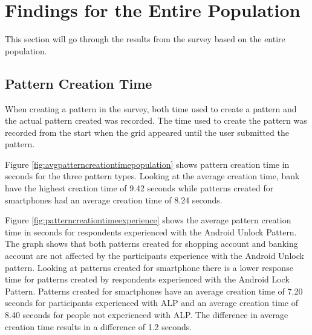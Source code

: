 \section{Findings for the Entire Population}
  
  This section will go through the results from the survey based on the entire population. 

  


	\subsection{Pattern Creation Time}
    When creating a pattern in the survey, both time used to create a pattern and the actual pattern created was recorded. The time used to create the pattern was recorded from the start when the grid appeared until the user submitted the pattern.

    Figure \ref{fig:avgpatterncreationtimepopulation} shows pattern creation time in seconds for the three pattern types. Looking at the average creation time, bank have the highest creation time of 9.42 seconds while patterns created for smartphones had an average creation time of 8.24 seconds. 

    Figure \ref{fig:patterncreationtimeexperience} shows the average pattern creation time in seconds for respondents experienced with the Android Unlock Pattern. The graph shows that both patterns created for shopping account and banking account are not affected by the participants experience with the Android Unlock pattern. Looking at patterns created for smartphone there is a lower response time for patterns created by respondents experienced with the Android Lock Pattern. Patterns created for smartphones have an average creation time of 7.20 seconds for participants experienced with ALP and an average creation time of 8.40 seconds for people not experienced with ALP. The difference in average creation time results in a difference of 1.2 seconds. 

